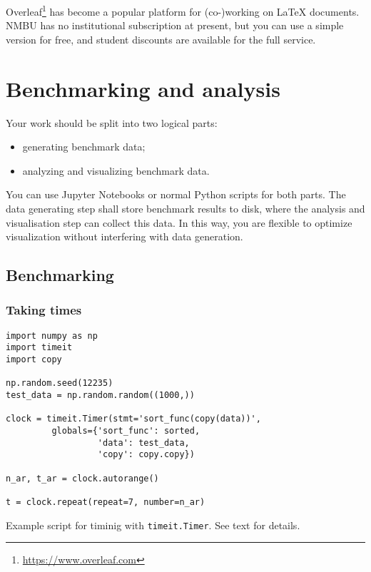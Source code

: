 \documentclass[sigconf, nonacm, natbib, screen, balance=False]{acmart}
\begin{document}
Overleaf\footnote{\url{https://www.overleaf.com}} has become a popular
platform for (co-)working on \LaTeX{} documents. NMBU has no
institutional subscription at present, but you can use a simple
version for free, and student discounts are available for the full service.

\section{Benchmarking and analysis}\label{sec:benchanalyze}

Your work should be split into two logical parts:
\begin{itemize}
\item generating benchmark data;
\item analyzing and visualizing benchmark data.
\end{itemize}

You can use Jupyter Notebooks or normal Python scripts for both
parts. The data generating step shall store benchmark results to disk,
where the analysis and visualisation step can collect this data. In
this way, you are flexible to optimize visualization without
interfering with data generation.

\subsection{Benchmarking}\label{sec:bench}

\subsubsection{Taking times}

\begin{listing}
\begin{lstlisting}
import numpy as np
import timeit
import copy

np.random.seed(12235)
test_data = np.random.random((1000,))

clock = timeit.Timer(stmt='sort_func(copy(data))',
         globals={'sort_func': sorted,
                  'data': test_data,
                  'copy': copy.copy})

n_ar, t_ar = clock.autorange()

t = clock.repeat(repeat=7, number=n_ar)
\end{lstlisting}
  \caption{Example script for timinig with \texttt{timeit.Timer}. See
    text for details.}
  \label{lst:timeit}
\end{listing}
\end{document}
